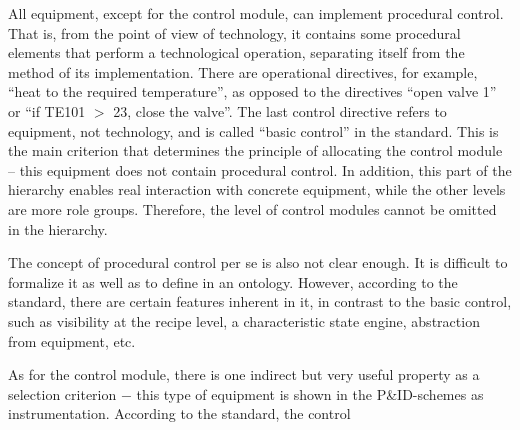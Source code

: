 \documentclass[10pt,twocolumn]{article}
\begin{document}
All equipment, except for the control module, can
implement procedural control. That is, from the point
of view of technology, it contains some procedural elements that perform a technological operation, separating
itself from the method of its implementation. There are
operational directives, for example, “heat to the required
temperature”, as opposed to the directives “open valve
1” or “if TE101 $>$ 23, close the valve”. The last control
directive refers to equipment, not technology, and is called
“basic control” in the standard. This is the main criterion
that determines the principle of allocating the control
module – this equipment does not contain procedural
control. In addition, this part of the hierarchy enables
real interaction with concrete equipment, while the other
levels are more role groups. Therefore, the level of control
modules cannot be omitted in the hierarchy.


The concept of procedural control per se is also not
clear enough. It is difficult to formalize it as well as to
define in an ontology. However, according to the standard,
there are certain features inherent in it, in contrast to the
basic control, such as visibility at the recipe level, a
characteristic state engine, abstraction from equipment,
etc.


As for the control module, there is one indirect but
very useful property as a selection criterion  $-$  this
type of equipment is shown in the P\&ID-schemes as
instrumentation. According to the standard, the control
\end{document}
